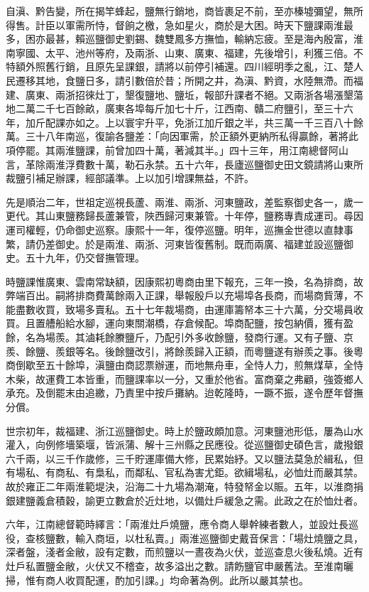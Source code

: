 \begin{pinyinscope}
自滇、黔告變，所在揭竿蜂起，鹽無行銷地，商皆裹足不前，至亦榛墟彌望，無所得售。計臣以軍需所恃，督餉之檄，急如星火，商於是大困。時天下鹽課兩淮最多，困亦最甚，賴巡鹽御史劉錫、魏雙鳳多方撫恤，輸納忘疲。至是海內殷富，淮南寧國、太平、池州等府，及兩浙、山東、廣東、福建，先後增引，利獲三倍。不特額外照舊行銷，且原先呈課銀，請將以前停引補還。四川經明季之亂，江、楚人民遷移其地，食鹽日多，請引數倍於昔；所開之井，為滇、黔資，水陸無滯。而福建、廣東、兩浙招徠灶丁，墾復鹽地、鹽坵，報部升課者不絕。又兩浙各場漲墾蕩地二萬二千七百餘畝，廣東各埠每斤加七十斤，江西南、贛二府鹽引，至三十六年，加斤配課亦如之。上以寰宇升平，免浙江加斤銀之半，共三萬一千三百八十餘萬。三十八年南巡，復諭各鹽差：「向因軍需，於正額外更納所私得贏餘，著將此項停罷。其兩淮鹽課，前曾加四十萬，著減其半。」四十三年，用江南總督阿山言，革除兩淮浮費數十萬，勒石永禁。五十六年，長廬巡鹽御史田文鏡請將山東所裁鹽引補足辦課，經部議準。上以加引增課無益，不許。

先是順治二年，世祖定巡視長蘆、兩淮、兩浙、河東鹽政，差監察御史各一，歲一更代。其山東鹽務歸長蘆兼管，陜西歸河東兼管。十年停，鹽務專責成運司。尋因運司權輕，仍命御史巡察。康熙十一年，復停巡鹽。明年，巡撫金世德以直隸事繁，請仍差御史。於是兩淮、兩浙、河東皆復舊制。既而兩廣、福建並設巡鹽御史。五十九年，仍交督撫管理。

時鹽課惟廣東、雲南常缺額，因康熙初粵商由里下報充，三年一換，名為排商，故弊端百出。嗣將排商費萬餘兩入正課，舉報殷戶以充場埠各長商，而場商貲薄，不能盡數收買，致場多賣私。五十七年裁場商，由運庫籌帑本三十六萬，分交場員收買。且置艚船給水腳，運向東關潮橋，存倉候配。埠商配鹽，按包納價，獲有盈餘，名為場羨。其滷耗餘賸鹽斤，乃配引外多收餘鹽，發商行運。又有子鹽、京羨、餘鹽、羨銀等名。後餘鹽改引，將餘羨歸入正額，而粵鹽遂有辦羨之事。後粵商倒歇至五十餘埠，滇鹽由商認票辦運，而地無舟車，全恃人力，煎無煤草，全恃木柴，故運費工本皆重，而鹽課率以一分，又重於他省。富商棄之弗顧，強簽鄉人承充。及倒罷末由追繳，乃責里中按戶攤納。迨乾隆時，一蹶不振，遂令歷年督撫分償。

世宗初年，裁福建、浙江巡鹽御史。時上於鹽政頗加意。河東鹽池形低，屢為山水灌入，向例修墻築堰，皆派蒲、解十三州縣之民應役。從巡鹽御史碩色言，歲撥銀六千兩，以三千作歲修，三千貯運庫備大修，民累始紓。又以鹽法莫急於緝私，但有場私、有商私、有梟私，而鄰私、官私為害尤鉅。欲緝場私，必恤灶而嚴其禁。故於雍正二年兩淮範堤決，沿海二十九場為潮淹，特發帑金以賑。五年，以淮商捐銀建鹽義倉積穀，諭更立數倉於近灶地，以備灶戶緩急之需。此政之在於恤灶者。

六年，江南總督範時繹言：「兩淮灶戶燒鹽，應令商人舉幹練者數人，並設灶長巡役，查核鹽數，輸入商垣，以杜私賣。」兩淮巡鹽御史戴音保言：「場灶燒鹽之具，深者盤，淺者金敝，設有定數，而煎鹽以一晝夜為火伏，並巡查息火後私燒。近有灶戶私置鹽金敝，火伏又不稽查，故多溢出之數。請飭鹽官申嚴舊法。至淮南曬掃，惟有商人收買配運，酌加引課。」均命著為例。此所以嚴其禁也。


\end{pinyinscope}
